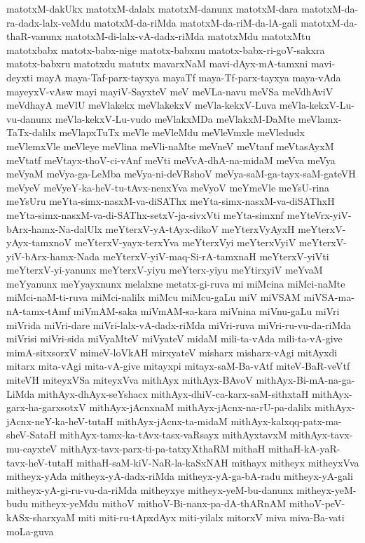 {matotxM-dakUkx
matotxM-dalalx
matotxM-danunx
matotxM-dara
matotxM-da-ra-dadx-lalx-veMdu
matotxM-da-riMda
matotxM-da-riM-da-lA-gali
matotxM-da-thaR-vanunx
matotxM-di-lalx-vA-dadx-riMda
matotxMdu
matotxMtu
matotxbabx
matotx-babx-nige
matotx-babxnu
matotx-babx-ri-goV-sakxra
matotx-babxru
matotxdu
matutx
mavarxNaM
mavi-dAyx-mA-tamxni
mavi-deyxti
mayA
maya-Taf-parx-tayxya
mayaTf
maya-Tf-parx-tayxya
maya-vAda
mayeyxV-vAsw
mayi
mayiV-SayxteV
meV
meVLa-navu
meVSa
meVdhAviV
meVdhayA
meVlU
meVlakekx
meVlakekxV
meVla-kekxV-Luva
meVla-kekxV-Lu-vu-danunx
meVla-kekxV-Lu-vudo
meVlakxMDa
meVlakxM-DaMte
meVlamx-TaTx-dalilx
meVlapxTuTx
meVle
meVleMdu
meVleVmxle
meVledudx
meVlemxVle
meVleye
meVlina
meVli-naMte
meVneV
meVtanf
meVtasAyxM
meVtatf
meVtayx-thoV-ci-vAnf
meVti
meVvA-dhA-na-midaM
meVva
meVya
meVyaM
meVya-ga-LeMba
meVya-ni-deVRshoV
meVya-saM-ga-tayx-saM-gateVH
meVyeV
meVyeY-ka-heV-tu-tAvx-nenxYva
meVyoV
meYmeVle
meYsU-rina
meYsUru
meYta-simx-nasxM-va-diSAThx
meYta-simx-nasxM-va-diSAThxH
meYta-simx-nasxM-va-di-SAThx-setxV-ja-sivxVti
meYta-simxnf
meYteVrx-yiV-bArx-hamx-Na-dalUlx
meYterxV-yA-tAyx-dikoV
meYterxVyAyxH
meYterxV-yAyx-tamxnoV
meYterxV-yayx-terxYva
meYterxVyi
meYterxVyiV
meYterxV-yiV-bArx-hamx-Nada
meYterxV-yiV-maq-Si-rA-tamxnaH
meYterxV-yiVti
meYterxV-yi-yanunx
meYterxV-yiyu
meYterx-yiyu
meYtirxyiV
meYvaM
meYyanunx
meYyayxnunx
melalxne
metatx-gi-ruva
mi
miMcina
miMci-naMte
miMci-naM-ti-ruva
miMci-nalilx
miMcu
miMcu-gaLu
miV
miVSAM
miVSA-ma-nA-tamx-tAmf
miVmAM-saka
miVmAM-sa-kara
miVnina
miVnu-gaLu
miVri
miVrida
miVri-dare
miVri-lalx-vA-dadx-riMda
miVri-ruva
miVri-ru-vu-da-riMda
miVrisi
miVri-sida
miVyaMteV
miVyateV
midaM
mili-ta-vAda
mili-ta-vA-give
mimA-sitxsorxV
mimeV-loVkAH
mirxyateV
misharx
misharx-vAgi
mitAyxdi
mitarx
mita-vAgi
mita-vA-give
mitayxpi
mitayx-saM-Ba-vAtf
miteV-BaR-veVtf
miteVH
miteyxVSa
miteyxVva
mithAyx
mithAyx-BAvoV
mithAyx-Bi-mA-na-ga-LiMda
mithAyx-dhAyx-seYshacx
mithAyx-dhiV-ca-karx-saM-sithxtaH
mithAyx-garx-ha-garxsotxV
mithAyx-jAcnxnaM
mithAyx-jAcnx-na-rU-pa-dalilx
mithAyx-jAcnx-neY-ka-heV-tutaH
mithAyx-jAcnx-ta-midaM
mithAyx-kalxqq-patx-ma-sheV-SataH
mithAyx-tamx-ka-tAvx-tasx-vaRsayx
mithAyxtavxM
mithAyx-tavx-mu-cayxteV
mithAyx-tavx-parx-ti-pa-tatxyXthaRM
mithaH
mithaH-kA-yaR-tavx-heV-tutaH
mithaH-saM-kiV-NaR-la-kaSxNAH
mithayx
mitheyx
mitheyxVva
mitheyx-yAda
mitheyx-yA-dadx-riMda
mitheyx-yA-ga-bA-radu
mitheyx-yA-gali
mitheyx-yA-gi-ru-vu-da-riMda
mitheyxye
mitheyx-yeM-bu-danunx
mitheyx-yeM-budu
mitheyx-yeMdu
mithoV
mithoV-Bi-nanx-pa-dA-thARnAM
mithoV-peV-kASx-sharxyaM
miti
miti-ru-tApxdAyx
miti-yilalx
mitorxV
miva
miva-Ba-vati
moLa-guva
}
